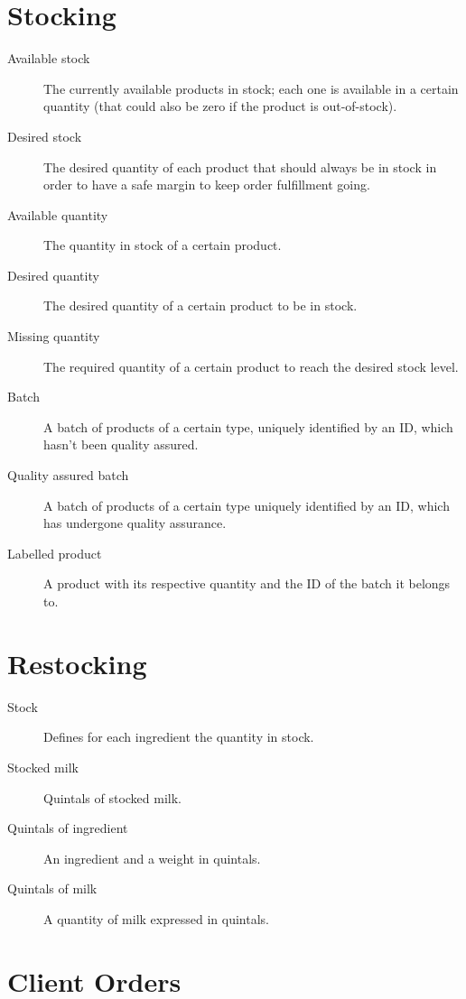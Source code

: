 \section{Stocking}
\begin{description}
    \item [Available stock] The currently available products in stock; each one is available in a certain quantity (that could also be zero if the product is out-of-stock).
    \item [Desired stock] The desired quantity of each product that should always be in stock in order to have a safe margin to keep order fulfillment going.
    \item [Available quantity] The quantity in stock of a certain product.
    \item [Desired quantity] The desired quantity of a certain product to be in stock.
    \item [Missing quantity] The required quantity of a certain product to reach the desired stock level.
    \item [Batch] A batch of products of a certain type, uniquely identified by an ID, which hasn't been quality assured.
    \item [Quality assured batch] A batch of products of a certain type uniquely identified by an ID, which has undergone quality assurance.
    \item [Labelled product] A product with its respective quantity and the ID of the batch it belongs to.
\end{description}

\section{Restocking}
\begin{description}
    \item[Stock] Defines for each ingredient the quantity in stock.
    \item[Stocked milk] Quintals of stocked milk.
    \item[Quintals of ingredient] An ingredient and a weight in quintals.
    \item[Quintals of milk] A quantity of milk expressed in quintals.
\end{description}

\section{Client Orders}

